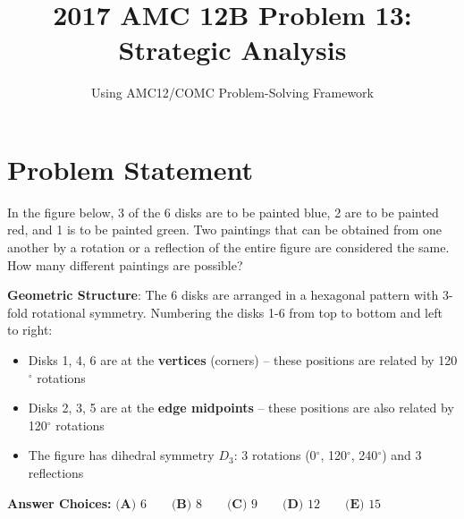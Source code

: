 \documentclass[11pt]{article}
\title{\textbf{2017 AMC 12B Problem 13: Strategic Analysis}}
\author{Using AMC12/COMC Problem-Solving Framework}
\date{}
\begin{document}
\maketitle

\section*{Problem Statement}
In the figure below, 3 of the 6 disks are to be painted blue, 2 are to be painted red, and 1 is to be painted green. Two paintings that can be obtained from one another by a rotation or a reflection of the entire figure are considered the same. How many different paintings are possible?

\textbf{Geometric Structure}: The 6 disks are arranged in a hexagonal pattern with 3-fold rotational symmetry. Numbering the disks 1-6 from top to bottom and left to right:
\begin{itemize}[leftmargin=*]
    \item Disks 1, 4, 6 are at the \textbf{vertices} (corners) -- these positions are related by 120$^\circ$ rotations
    \item Disks 2, 3, 5 are at the \textbf{edge midpoints} -- these positions are also related by 120$^\circ$ rotations
    \item The figure has dihedral symmetry $D_3$: 3 rotations (0$^\circ$, 120$^\circ$, 240$^\circ$) and 3 reflections
\end{itemize}

\textbf{Answer Choices:} 
$\textbf{(A) } 6 \qquad \textbf{(B) } 8 \qquad \textbf{(C) } 9 \qquad \textbf{(D) } 12 \qquad \textbf{(E) } 15$
\end{document}
